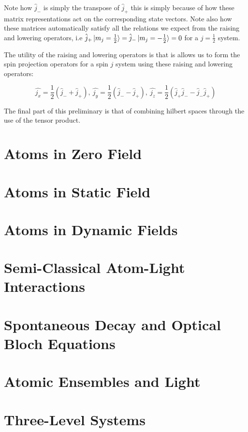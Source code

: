\documentclass[11pt,a4paper]{article}
\begin{document}
\noindent Note how $\hat{j}_-$ is simply the transpose of $\hat{j}_+$ this is simply because of how these matrix representations act on the corresponding state vectors. Note also how these matrices automatically satisfy all the relations we expect from the raising and lowering operators, i.e $\hat{j}_+ \ket{m_j = \frac{1}{2}} = \hat{j}_- \ket{m_j = - \frac{1}{2}} = 0$ for a $j = \frac{1}{2}$ system.

\noindent The utility of the raising and lowering operators is that is allows us to form the spin projection operators for a spin $j$ system using these raising and lowering operators:

\begin{equation}
    \hat{j_x} = \frac{1}{2}(\hat{j}_- + \hat{j}_+),~\hat{j_y} = \frac{1}{2}(\hat{j}_- - \hat{j}_+),~\hat{j_z} = \frac{1}{2}(\hat{j}_+ \hat{j}_- - \hat{j}_- \hat{j}_+)
    \label{GeneralSpin_j_ProjectionOperators}
\end{equation}

The final part of this preliminary is that of combining hilbert spaces through the use of the tensor product.

\section{Atoms in Zero Field}

\section{Atoms in Static Field}

\section{Atoms in Dynamic Fields}

\section{Semi-Classical Atom-Light Interactions}

\section{Spontaneous Decay and Optical Bloch Equations}

\section{Atomic Ensembles and Light}

\section{Three-Level Systems}




\end{document}
